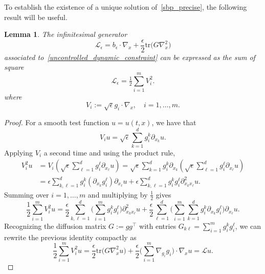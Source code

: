 \documentclass{amsart}
\newtheorem{lemma}[theorem]{Lemma}
\numberwithin{equation}{section}
\begin{document}
To establish the existence of a unique solution of~\eqref{sbp_precise}, the following result will be useful.
\begin{lemma} The infinitesimal generator 
\begin{equation}\label{eq:Ito-generator}
\mathcal L_\epsilon 
= b_\epsilon\cdot\nabla_x +\frac{\epsilon}{2}\mathrm{tr}\!\big(G\nabla_x^2\big)
\end{equation}
associated to~\eqref{uncontrolled_dynamic_constraint} can be expressed as the sum of square 
\begin{equation}\label{eq:sum-of-squares}
  \mathcal L_{\epsilon}= \tfrac12\sum_{i=1}^m V_i^2.
\end{equation}
where
\begin{equation}\label{eq: trans_vec_field}
V_i:=\sqrt{\epsilon}  g_i\cdot\nabla_x,\quad i=1,\dots,m.
\end{equation}
\end{lemma}
\begin{proof}
For a smooth test function $u=u(t,x)$, we have that
\[
V_i u
= \sqrt{\epsilon}\sum_{k=1}^d g^{k}_i\partial_{ x_k}u.
\]
Applying $V_i$ a second time and using the product rule,
\[
\begin{aligned}
V_i^2 u
&= V_i\left( \sqrt{\epsilon}\sum_{\ell=1}^d g^{\ell}_i\partial_{ x_\ell} u \right)
= \sqrt{\epsilon}\sum_{k=1}^d g^{k}_i\partial_{ x_k}
\left( \sqrt{\epsilon}\sum_{\ell=1}^d g^{\ell}_i\partial_{ x_\ell} u \right)\\
&= \epsilon\sum_{k,\ell=1}^d g^{k}_i(\partial_{ x_k} g^{\ell}_i)\partial_{ x_\ell} u+\epsilon\sum_{k,\ell=1}^d g^{k}_ig^{\ell}_i\partial_{ x_k  x_\ell}^2 u.
\end{aligned}
\]
Summing over $i=1,\dots,m$ and multiplying by $\tfrac12$ gives
\[
\frac12\sum_{i=1}^m V_i^2 u
= \frac{\epsilon}{2}\sum_{k,\ell=1}^d
\Big(\sum_{i=1}^m g^{k}_i g^{\ell}_i\Big)\partial_{ x_k  x_\ell}^2 u
+\frac{\epsilon}{2}\sum_{\ell=1}^d
\Big(\sum_{i=1}^m\sum_{k=1}^d g^{k}_i\partial_{ x_k} g^{\ell}_i\Big)\partial_{ x_\ell} u.
\]
Recognizing the diffusion matrix $G:=g g^\top$ with entries
$G_{k\ell}=\sum_{i=1}^m g^{k}_i g^{\ell}_i$,
we can rewrite the previous identity compactly as
\begin{equation}\label{eq:sum-of-squares-expanded}
\frac12\sum_{i=1}^m V_i^2 u
=\frac{\epsilon}{2}\mathrm{tr}\big(G\nabla_x^2 u\big)
+\frac{\epsilon}{2}\Big(\sum_{i=1}^m \nabla_{g_i}g_i\Big)\cdot\nabla_x u=\mathcal Lu.
\end{equation} 
\end{proof}
\end{document}
